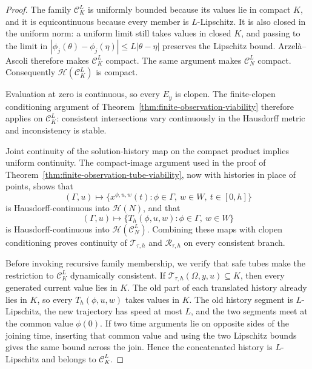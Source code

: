 \documentclass[11pt]{article}
\theoremstyle{definition}
\begin{document}
\begin{proof}
The family $\mathscr C_K^L$ is uniformly bounded because its values lie in
compact $K$, and it is equicontinuous because every member is
$L$-Lipschitz.  It is also closed in the uniform norm: a uniform limit still
takes values in closed $K$, and passing to the limit in
$|\phi_j(\theta)-\phi_j(\eta)|\le L|\theta-\eta|$ preserves the Lipschitz
bound.  Arzel\`a--Ascoli therefore makes $\mathscr C_K^L$ compact.  The same
argument makes $\mathscr C_N^L$ compact.  Consequently
$\mathcal H(\mathscr C_K^L)$ is compact.

Evaluation at zero is continuous, so every $E_y$ is clopen.  The
finite-clopen conditioning argument of
Theorem~\ref{thm:finite-observation-viability} therefore applies on
$\mathscr C_K^L$: consistent intersections vary continuously in the
Hausdorff metric and inconsistency is stable.

Joint continuity of the solution-history map on the compact product implies
uniform continuity.  The compact-image argument used in the proof of
Theorem~\ref{thm:finite-observation-tube-viability}, now with histories in
place of points, shows that
\[
(\Gamma,u)\longmapsto
\{x^{\phi,u,w}(t):\phi\in\Gamma,\ w\in W,\ t\in[0,h]\}
\]
is Hausdorff-continuous into $\mathcal H(N)$, and that
\[
(\Gamma,u)\longmapsto
\{T_h(\phi,u,w):\phi\in\Gamma,\ w\in W\}
\]
is Hausdorff-continuous into $\mathcal H(\mathscr C_N^L)$.  Combining these
maps with clopen conditioning proves continuity of
$\mathscr T_{\tau,h}$ and $\mathscr R_{\tau,h}$ on every consistent branch.

Before invoking recursive family membership, we verify that safe tubes make the restriction to
$\mathscr C_K^L$ dynamically consistent.  If
$\mathscr T_{\tau,h}(\Omega,y,u)\subseteq K$, then every generated current
value lies in $K$.  The old part of each translated history already lies in
$K$, so every $T_h(\phi,u,w)$ takes values in $K$.  The old history segment
is $L$-Lipschitz, the new trajectory has speed at most $L$, and the two
segments meet at the common value $\phi(0)$.  If two time arguments lie on
opposite sides of the joining time, inserting that common value and using
the two Lipschitz bounds gives the same bound across the join.  Hence the
concatenated history is $L$-Lipschitz and belongs to $\mathscr C_K^L$.


\end{proof}
\end{document}
